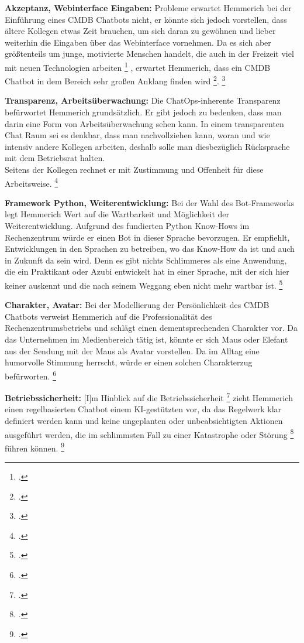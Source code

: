 \textbf{Akzeptanz, Webinterface Eingaben: }Probleme erwartet Hemmerich bei der Einführung eines \acs{CMDB} Chatbots nicht, er könnte sich jedoch vorstellen, dass ältere Kollegen etwas Zeit brauchen, um sich daran zu gewöhnen und lieber weiterhin die Eingaben über das Webinterface vornehmen. 
Da es sich aber größtenteils um junge, motivierte Menschen handelt, \glqq{}die auch in der Freizeit viel mit neuen Technologien arbeiten\grqq
\footcite[][o. \pno]{Hemm_2019}
, erwartet Hemmerich, dass ein \acs{CMDB} Chatbot \glqq{}in dem Bereich sehr großen Anklang finden wird\grqq
\footcite[][o. \pno]{Hemm_2019}{}.
\footcite[Vgl.][o. \pno]{Hemm_2019}

\textbf{Transparenz, Arbeitsüberwachung: }Die ChatOps-inherente Transparenz befürwortet Hemmerich grundsätzlich. Er gibt jedoch zu bedenken, dass man darin eine Form von Arbeitsüberwachung sehen kann. In einem transparenten Chat Raum sei es denkbar, dass man nachvollziehen kann, woran und wie intensiv andere Kollegen arbeiten, deshalb solle man diesbezüglich Rücksprache mit dem Betriebsrat halten.\\
Seitens der Kollegen rechnet er mit Zustimmung und Offenheit für diese Arbeitsweise. 
\footcite[Vgl.][o. \pno]{Hemm_2019}

\textbf{Framework Python, Weiterentwicklung: }Bei der Wahl des Bot-Frameworks legt Hemmerich Wert auf die Wartbarkeit und Möglichkeit der Weiterentwicklung. Aufgrund des fundierten Python Know-Hows im Rechenzentrum würde er einen Bot in dieser Sprache bevorzugen. Er empfiehlt, \glqq{}Entwicklungen in den Sprachen zu betreiben, wo das Know-How da ist und auch in Zukunft da sein wird. Denn es gibt nichts Schlimmeres als eine Anwendung, die ein Praktikant oder Azubi entwickelt hat in einer Sprache, mit der sich hier keiner auskennt und die nach seinem Weggang eben nicht mehr wartbar ist.\grqq
\footcites[][o. \pno]{Hemm_2019}[Vgl.][o. \pno]{Hemm_2019}

\textbf{Charakter, Avatar: }Bei der Modellierung der Persönlichkeit des \acs{CMDB} Chatbots verweist Hemmerich auf die Professionalität des Rechenzentrumsbetriebs und schlägt einen dementsprechenden Charakter vor. Da das Unternehmen im Medienbereich tätig ist, könnte er sich Maus oder Elefant aus der Sendung mit der Maus als Avatar vorstellen. Da im Alltag eine humorvolle Stimmung herrscht, würde er einen solchen Charakterzug befürworten.  
\footcite[Vgl.][o. \pno]{Hemm_2019}

\textbf{Betriebssicherheit: }\glqq{}[I]m Hinblick auf die Betriebssicherheit\grqq
\footcite[][o. \pno]{Hemm_2019}
zieht Hemmerich einen regelbasierten Chatbot einem KI-gestützten vor, da das Regelwerk klar definiert werden kann und keine ungeplanten oder unbeabsichtigten Aktionen ausgeführt werden, die im schlimmsten Fall zu \glqq{}einer Katastrophe oder Störung\grqq 
\footcite[][o. \pno]{Hemm_2019}
 führen können. 
\footcite[Vgl.][o. \pno]{Hemm_2019}

